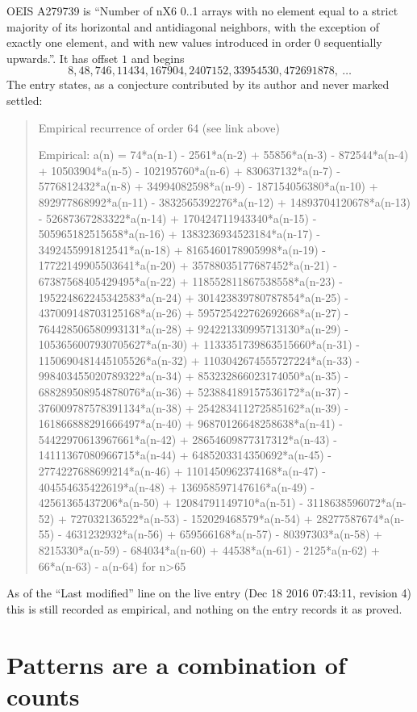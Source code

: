 \documentclass[11pt,a4paper]{article}
\theoremstyle{plain}
\theoremstyle{definition}
\begin{document}
OEIS A279739 is ``Number of nX6 0..1 arrays with no element equal to a strict majority of its horizontal and antidiagonal neighbors, with the exception of exactly one element, and with new values introduced in order 0 sequentially upwards.''. It has offset $1$ and begins
\[
8, 48, 746, 11434, 167904, 2407152, 33954530, 472691878,\ \dots
\]
The entry states, as a conjecture contributed by its author and never marked settled:
\begin{quote}
Empirical recurrence of order 64 (see link above)

Empirical: a(n) = 74*a(n-1) - 2561*a(n-2) + 55856*a(n-3) - 872544*a(n-4) + 10503904*a(n-5) - 102195760*a(n-6) + 830637132*a(n-7) - 5776812432*a(n-8) + 34994082598*a(n-9) - 187154056380*a(n-10) + 892977868992*a(n-11) - 3832565392276*a(n-12) + 14893704120678*a(n-13) - 52687367283322*a(n-14) + 170424711943340*a(n-15) - 505965182515658*a(n-16) + 1383236934523184*a(n-17) - 3492455991812541*a(n-18) + 8165460178905998*a(n-19) - 17722149905503641*a(n-20) + 35788035177687452*a(n-21) - 67387568405429495*a(n-22) + 118552811867538558*a(n-23) - 195224862245342583*a(n-24) + 301423839780787854*a(n-25) - 437009148703125168*a(n-26) + 595725422762692668*a(n-27) - 764428506580993131*a(n-28) + 924221330995713130*a(n-29) - 1053656007930705627*a(n-30) + 1133351739863515660*a(n-31) - 1150690481445105526*a(n-32) + 1103042674555727224*a(n-33) - 998403455020789322*a(n-34) + 853232866023174050*a(n-35) - 688289508954878076*a(n-36) + 523884189157536172*a(n-37) - 376009787578391134*a(n-38) + 254283411272585162*a(n-39) - 161866888291666497*a(n-40) + 96870126648258638*a(n-41) - 54422970613967661*a(n-42) + 28654609877317312*a(n-43) - 14111367080966715*a(n-44) + 6485203314350692*a(n-45) - 2774227688699214*a(n-46) + 1101450962374168*a(n-47) - 404554635422619*a(n-48) + 136958597147616*a(n-49) - 42561365437206*a(n-50) + 12084791149710*a(n-51) - 3118638596072*a(n-52) + 727032136522*a(n-53) - 152029468579*a(n-54) + 28277587674*a(n-55) - 4631232932*a(n-56) + 659566168*a(n-57) - 80397303*a(n-58) + 8215330*a(n-59) - 684034*a(n-60) + 44538*a(n-61) - 2125*a(n-62) + 66*a(n-63) - a(n-64) for n>65
\end{quote}
As of the ``Last modified'' line on the live entry (Dec 18 2016 07:43:11, revision 4) this is still
recorded as empirical, and nothing on the entry records it as proved.

\section{Patterns are a combination of counts}
\end{document}
